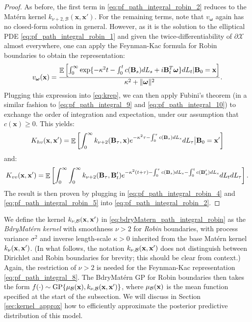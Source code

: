 \documentclass[aos,preprint]{imsart}
\theoremstyle{plain}
\DeclareMathOperator{\E}{\mathbb E}
\newcommand{\Bx}{\bold x}
\newcommand{\BFx}{\bold x}
\newcommand{\Bomega}{\boldsymbol{\omega}}
\theoremstyle{remark}
\begin{document}
\begin{proof}
As before, the first term in \eqref{eq:pf_path_integral_robin_2} reduces to the Mat\'ern kernel $k_{\nu+2,\mathcal{B}}(\mathbf{x},\mathbf{x}')$. For the remaining terms, note that $v_{\Bomega}$ again has no closed-form solution in general. However, as it is the solution to the elliptical PDE \eqref{eq:pf_path_integral_robin_1} and given the twice-differentiability of $\partial \mathcal{X}$ almost everywhere, one can apply the Feynman-Kac formula for Robin boundaries \cite[Corollary 4.4]{papanicolaou1990probabilistic} to obtain the representation:
\begin{equation}
    v_{\Bomega}(\BFx)=\frac{\E\left[\int_0^\infty \exp\{-\kappa^2t-\int_0^tc(\bold{B}_s)dL_s +i\bold{B}_t^T{\Bomega}\}dL_t|\bold{B}_0=\BFx\right]}{\kappa^2+\|\Bomega\|^2}. \label{eq:pf_path_integral_robin_3}
\end{equation}
Plugging this expression into \eqref{eq:krep}, we can then apply Fubini's theorem (in a similar fashion to \eqref{eq:pf_path_integral_9} and \eqref{eq:pf_path_integral_10}) to exchange the order of integration and expectation, under our assumption that $c(\mathbf{x}) \geq 0$. This yields:
\begin{equation}
    \label{eq:pf_path_integral_robin_4}
    K_{hv}(\BFx,\BFx')=\E\left[\int_0^{\infty} k_{\nu+2}(\bold{B}_{\tau},\BFx)e^{-\kappa^2\tau-\int_0^\tau c(\bold{B}_{s})dL_s}dL_\tau\big|\bold{B}_0=\BFx'\right]
\end{equation}
and:
\begin{align}
\label{eq:pf_path_integral_robin_5}
    K_{vv}(\BFx,\BFx')=\E\left[\int_0^{\infty}\int_0^{\infty} k_{\nu+2}(\bold{B}_{\tau},\bold{B}'_{t})e^{-\kappa^2(t+\tau)-\int_0^\tau c(\bold{B}_{s})dL_s-\int_0^tc(\bold{B}'_{s})dL_s}dL_tdL_\tau\right].
\end{align}
The result is then proven by plugging in \eqref{eq:pf_path_integral_robin_4} and \eqref{eq:pf_path_integral_robin_5} into \eqref{eq:pf_path_integral_robin_2}.
\end{proof}

We define the kernel $ k_{\nu,\mathcal{B}}(\BFx,\BFx')$ in \eqref{eq:bdryMatern_path_integral_robin} as the \textit{BdryMat\'ern kernel} with smoothness $\nu > 2$ for \textit{Robin} boundaries, with process variance $\sigma^2$ and inverse length-scale $\kappa > 0$ inherited from the base Mat\'ern kernel $k_\nu(\BFx, \BFx')$. (In what follows, the notation $k_{\nu,\mathcal{B}}(\BFx,\BFx')$ does not distinguish between Dirichlet and Robin boundaries for brevity; this should be clear from context.) Again, the restriction of $\nu > 2$ is needed for the Feynman-Kac representation \eqref{eq:pf_path_integral_8}. The BdryMat\'ern GP for Robin boundaries then takes the form $f(\cdot) \sim \text{GP}\{\mu_{\mathcal{B}}(\Bx),k_{\nu,\mathcal{B}}(\BFx,\BFx')\}$, where $\mu_{\mathcal{B}}(\Bx)$ is the mean function specified at the start of the subsection. We will discuss in Section \ref{sec:kernel_approx} how to efficiently approximate the posterior predictive distribution of this model.
\end{document}
